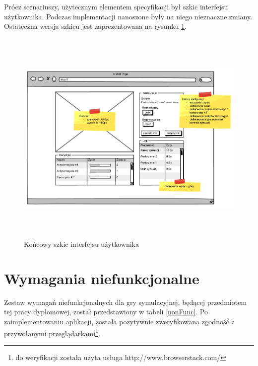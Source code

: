 Prócz scenariuszy, użytecznym elementem specyfikacji był szkic interfejsu użytkownika. Podczas implementacji nanoszone były na niego nieznaczne zmiany. Ostateczna wersja szkicu jest zaprezentowana na rysunku \ref{wireframe}.

\begin{figure}
\begin{center}
	\includegraphics[width=160mm,height=106mm]{images/wireframe}
	\caption{Końcowy szkic interfejsu użytkownika\label{wireframe}}
\end{center}
\end{figure}

\section{Wymagania niefunkcjonalne}
Zestaw wymagań niefunkcjonalnych dla gry symulacyjnej, będącej przedmiotem tej pracy dyplomowej, został przedstawiony w tabeli \ref{nonFunc}. Po zaimplementowaniu aplikacji, została pozytywnie zweryfikowana zgodność z przywołanymi przeglądarkami\footnote{do weryfikacji została użyta usługa http://www.browserstack.com/}.

